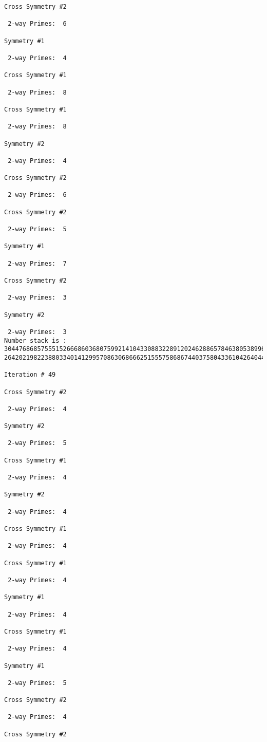 \begin{verbatim}
Cross Symmetry #2

 2-way Primes: 	6

Symmetry #1

 2-way Primes: 	4

Cross Symmetry #1

 2-way Primes: 	8

Cross Symmetry #1

 2-way Primes: 	8

Symmetry #2

 2-way Primes: 	4

Cross Symmetry #2

 2-way Primes: 	6

Cross Symmetry #2

 2-way Primes: 	5

Symmetry #1

 2-way Primes: 	7

Cross Symmetry #2

 2-way Primes: 	3

Symmetry #2

 2-way Primes: 	3
Number stack is :
30447686857555152666860368075992141043308832289120246288657846380538996794608835958544046240163340857
26420219822388033401412995708630686662515557586867440375804336104264044585953880649769983508364875688

Iteration #	49

Cross Symmetry #2

 2-way Primes: 	4

Symmetry #2

 2-way Primes: 	5

Cross Symmetry #1

 2-way Primes: 	4

Symmetry #2

 2-way Primes: 	4

Cross Symmetry #1

 2-way Primes: 	4

Cross Symmetry #1

 2-way Primes: 	4

Symmetry #1

 2-way Primes: 	4

Cross Symmetry #1

 2-way Primes: 	4

Symmetry #1

 2-way Primes: 	5

Cross Symmetry #2

 2-way Primes: 	4

Cross Symmetry #2


\end{verbatim}
